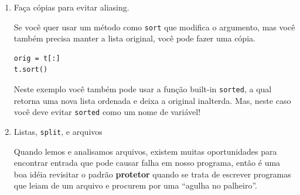 \begin{enumerate}


\item Faça cópias para evitar aliasing.





Se você quer usar um método como {\tt sort} que modifica
o argumento, mas você também precisa manter a lista original,
você pode fazer uma cópia.



\beforeverb
\begin{verbatim}
orig = t[:]
t.sort()
\end{verbatim}
\afterverb

Neste exemplo você também pode usar a função built-in {\tt sorted},
a qual retorna uma nova lista ordenada e deixa a original inalterda.
Mas, neste caso você deve evitar {\tt sorted} como um nome de variável!


\item Listas, {\tt split}, e arquivos

Quando lemos e analisamos arquivos, existem muitas oportunidades
para encontrar entrada que pode causar falha em nosso programa,
então é uma boa idéia revisitar o padrão {\bf protetor} quando
se trata de escrever programas que leiam de um arquivo e procurem
por uma ``agulha no palheiro''.



\end{enumerate}
